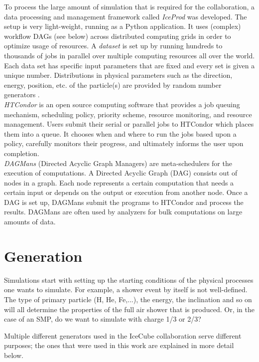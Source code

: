 \noindent To process the large amount of simulation that is required for the collaboration, a data processing and management framework called \textit{IceProd} was developed. The setup is very light-weight, running as a Python application. It uses (complex) workflow DAGs (see below) across distributed computing grids in order to optimize usage of resources. A \textit{dataset} is set up by running hundreds to thousands of jobs in parallel over multiple computing resources all over the world. Each data set has specific input parameters that are fixed and every set is given a unique number. Distributions in physical parameters such as the direction, energy, position, etc. of the particle(s) are provided by random number generators \cite{1742-6596-664-6-062056}.\\

\noindent \textit{HTCondor} is an open source computing software that provides a job queuing mechanism, scheduling policy, priority scheme, resource monitoring, and resource management. Users submit their serial or parallel jobs to HTCondor which places them into a queue. It chooses when and where to run the jobs based upon a policy, carefully monitors their progress, and ultimately informs the user upon completion.\\

\noindent \textit{DAGMans} (Directed Acyclic Graph Managers) are meta-schedulers for the execution of computations. A Directed Acyclic Graph (DAG) consists out of nodes in a graph. Each node represents a certain computation that needs a certain input or depends on the output or execution from another node. Once a DAG is set up, DAGMans submit the programs to HTCondor and process the results. DAGMans are often used by analyzers for bulk computations on large amounts of data.

\section{Generation}
Simulations start with setting up the starting conditions of the physical processes one wants to simulate. For example, a shower event by itself is not well-defined. The type of primary particle (H, He, Fe,...), the energy, the inclination and so on will all determine the properties of the full air shower that is produced. Or, in the case of an SMP, do we want to simulate with charge 1/3 or 2/3? 

Multiple different generators used in the IceCube collaboration serve different purposes; the ones that were used in this work are explained in more detail below.

